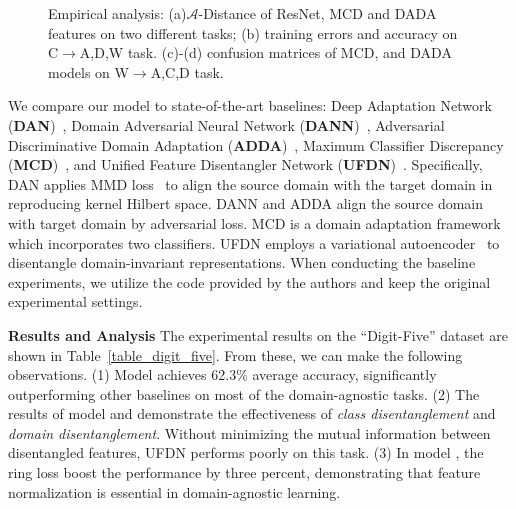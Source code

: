\documentclass{article}
\begin{document}
 \vspace{0.2cm}
\begin{figure*}[t]
    \begin{minipage}{\hsize}
      \centering
     \centering
      \centering
      \centering
    \end{minipage}
    \vspace{-0.4cm}
  \caption{Empirical analysis: (a)$\mathcal{A}$-Distance of ResNet, MCD and DADA features on two different tasks; (b) training errors and accuracy on C$\rightarrow$A,D,W task. (c)-(d) confusion matrices of MCD, and DADA models on W$\rightarrow$A,C,D task. }
  \label{fig_office_confusion}
  
\end{figure*} 
We compare our model to state-of-the-art baselines: Deep Adaptation Network (\textbf{DAN})~\cite{long2015}, Domain Adversarial Neural Network (\textbf{DANN})~\cite{DANN}, Adversarial Discriminative Domain Adaptation (\textbf{ADDA})~\cite{adda}, Maximum Classifier Discrepancy (\textbf{MCD})~\cite{MCD_2018}, and Unified Feature Disentangler Network (\textbf{UFDN})~\cite{ufdn}. Specifically, DAN applies MMD loss~\cite{gretton2007kernel} to align the source domain with the target domain in reproducing kernel Hilbert space. DANN and ADDA align the source domain with target domain by adversarial loss. MCD is a domain adaptation framework which incorporates two  classifiers. UFDN employs a variational autoencoder~\cite{vae} to disentangle domain-invariant representations. When conducting the baseline experiments, we utilize the code provided by the authors and keep the original experimental settings. 

\textbf{Results and Analysis} The experimental results on the ``Digit-Five'' dataset are shown in Table~\ref{table_digit_five}. From these, we can make the following observations. (1) Model \textbf{} achieves 62.3\% average accuracy, significantly outperforming other baselines on most of the domain-agnostic tasks. (2) The results of model \textbf{} and \textbf{} demonstrate the effectiveness of \textit{class disentanglement} and \textit{domain disentanglement}. Without minimizing the mutual information between disentangled features, UFDN performs poorly on this task. (3) In model \textbf{}, the ring loss boost the performance by three percent, demonstrating that feature normalization is essential in domain-agnostic learning.
\end{document}
